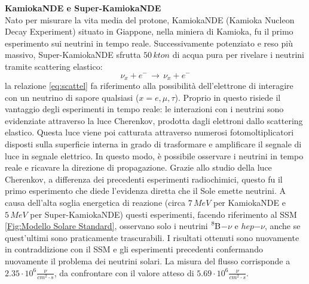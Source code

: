 \textbf{KamiokaNDE e Super-KamiokaNDE} \\
Nato per misurare la vita media del protone, KamiokaNDE (Kamioka Nucleon Decay Experiment) situato in Giappone, nella miniera di Kamioka, fu il primo esperimento sui neutrini in tempo reale. Successivamente potenziato e reso più massivo, Super-KamiokaNDE sfrutta $50\,\unit{kton}$ di acqua pura per rivelare i neutrini tramite scattering elastico:
\begin{equation}
    \nu_x+e^-\,\rightarrow\,\nu_x+e^-
    \label{eq:scattel}
\end{equation}
la relazione \ref{eq:scattel} fa riferimento alla possibilità dell'elettrone di interagire con un neutrino di sapore qualsiasi ($x=e,\mu,\tau$). Proprio in questo risiede il vantaggio degli esperimenti in tempo reale: le interazioni con i neutrini sono evidenziate attraverso la luce Cherenkov, prodotta dagli elettroni dallo scattering elastico. Questa luce viene poi catturata attraverso numerosi fotomoltiplicatori disposti sulla superficie interna in grado di trasformare e amplificare il segnale di luce in segnale elettrico. In questo modo, è possibile osservare i neutrini in tempo reale e ricavare la direzione di propagazione. Grazie allo studio della luce Cherenkov, a differenza dei precedenti esperimenti radiochimici, questo fu il primo esperimento che diede l'evidenza diretta che il Sole emette neutrini. A causa dell'alta soglia energetica di reazione (circa $7\,\unit{MeV}$ per KamiokaNDE e $5\,\unit{MeV}$ per Super-KamiokaNDE) questi esperimenti, facendo riferimento al SSM \ref{Fig:Modello Solare Standard}, osservano solo i neutrini $\ce{^8B}$$-\nu$ e $hep$$-\nu$, anche se quest'ultimi sono praticamente trascurabili.
   I risultati ottenuti sono nuovamente in contraddizione con il SSM e gli esperimenti precedenti confermando nuovamente il problema dei neutrini solari. La misura del flusso corrisponde a $2.35\cdot10^{6}\frac{\nu}{\unit{cm}^2\cdot \unit{s}}$, da confrontare con il valore atteso di $5.69\cdot10^{6}\frac{\nu}{\unit{cm}^2\cdot \unit{s}}$.


\vspace{0,5cm}

